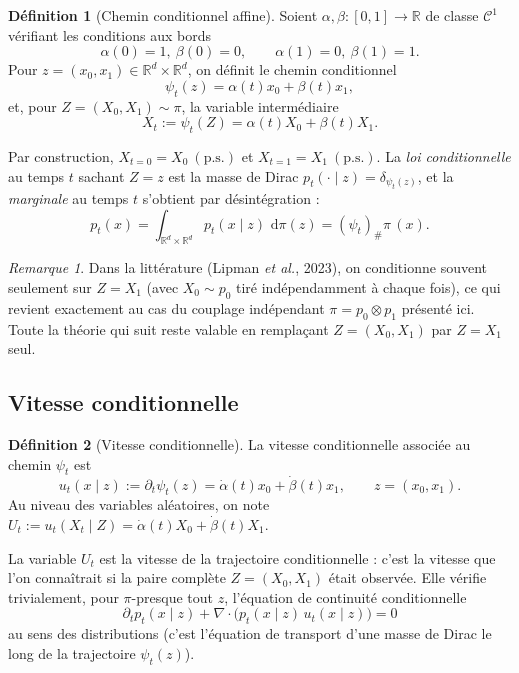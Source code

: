 \documentclass[11pt,a4paper]{article}
\theoremstyle{definition}
\newtheorem{definition}{Définition}[section]
\theoremstyle{plain}
\theoremstyle{remark}
\newtheorem{remark}{Remarque}[section]
\newcommand{\R}{\mathbb{R}}
\newcommand{\dd}{\,\mathrm{d}}
\newcommand{\ps}{\text{p.s.}}
\begin{document}
\begin{definition}[Chemin conditionnel affine]
Soient $\alpha,\beta:[0,1]\to\R$ de classe $\mathcal{C}^1$ vérifiant les
conditions aux bords
\[
  \alpha(0)=1,\ \beta(0)=0,
  \qquad
  \alpha(1)=0,\ \beta(1)=1.
\]
Pour $z=(x_0,x_1)\in\R^d\times\R^d$, on définit le chemin conditionnel
\[
  \psi_t(z) = \alpha(t)x_0+\beta(t)x_1,
\]
et, pour $Z=(X_0,X_1)\sim\pi$, la variable intermédiaire
\[
  X_t := \psi_t(Z) = \alpha(t)X_0+\beta(t)X_1.
\]
\end{definition}

Par construction, $X_{t=0}=X_0\ (\ps)$ et $X_{t=1}=X_1\ (\ps)$. La \emph{loi
conditionnelle} au temps $t$ sachant $Z=z$ est la masse de Dirac
$p_t(\cdot\mid z)=\delta_{\psi_t(z)}$, et la \emph{marginale} au temps $t$
s'obtient par désintégration :
\[
  p_t(x) = \int_{\R^d\times\R^d} p_t(x\mid z)\,\dd\pi(z)
  =
  (\psi_t)_\#\pi\,(x).
\]

\begin{remark}\label{rem:cond-x1}
Dans la littérature (Lipman \emph{et al.}, 2023), on conditionne souvent
seulement sur $Z=X_1$ (avec $X_0\sim p_0$ tiré indépendamment à chaque fois), ce
qui revient exactement au cas du couplage indépendant $\pi=p_0\otimes p_1$
présenté ici. Toute la théorie qui suit reste valable en remplaçant $Z=(X_0,X_1)$
par $Z=X_1$ seul.
\end{remark}

\subsection{Vitesse conditionnelle}

\begin{definition}[Vitesse conditionnelle]
La vitesse conditionnelle associée au chemin $\psi_t$ est
\[
  u_t(x\mid z) := \partial_t \psi_t(z) = \dot\alpha(t)x_0+\dot\beta(t)x_1,
  \qquad z=(x_0,x_1).
\]
Au niveau des variables aléatoires, on note $U_t:=u_t(X_t\mid Z)=\dot\alpha(t)X_0+\dot\beta(t)X_1$.
\end{definition}

La variable $U_t$ est la vitesse de la trajectoire conditionnelle : c'est la
vitesse que l'on connaîtrait si la paire complète $Z=(X_0,X_1)$ était observée.
Elle vérifie trivialement, pour $\pi$-presque tout $z$, l'équation de continuité
conditionnelle
\[
  \partial_t p_t(x\mid z) + \nabla\cdot\bigl(p_t(x\mid z)\,u_t(x\mid z)\bigr) = 0
  \tag{EC-cond}
\]
au sens des distributions (c'est l'équation de transport d'une masse de Dirac
le long de la trajectoire $\psi_t(z)$).
\end{document}
